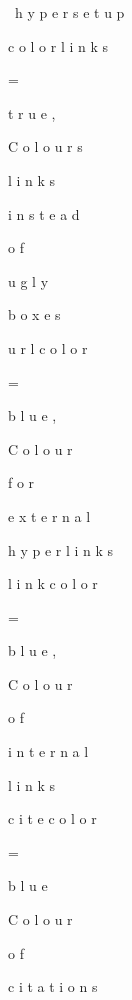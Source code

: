\
h
y
p
e
r
s
e
t
u
p
{

 
 
 
 
c
o
l
o
r
l
i
n
k
s
 
 
 
=
 
t
r
u
e
,
 
 
 
 
%
 
C
o
l
o
u
r
s
 
l
i
n
k
s
 
i
n
s
t
e
a
d
 
o
f
 
u
g
l
y
 
b
o
x
e
s

 
 
 
 
u
r
l
c
o
l
o
r
 
 
 
 
 
=
 
b
l
u
e
,
 
 
 
 
%
 
C
o
l
o
u
r
 
f
o
r
 
e
x
t
e
r
n
a
l
 
h
y
p
e
r
l
i
n
k
s

 
 
 
 
l
i
n
k
c
o
l
o
r
 
 
 
 
=
 
b
l
u
e
,
 
 
 
 
%
 
C
o
l
o
u
r
 
o
f
 
i
n
t
e
r
n
a
l
 
l
i
n
k
s

 
 
 
 
c
i
t
e
c
o
l
o
r
 
 
 
 
=
 
b
l
u
e
 
 
 
 
 
 
%
 
C
o
l
o
u
r
 
o
f
 
c
i
t
a
t
i
o
n
s

 
 
 
 
}

